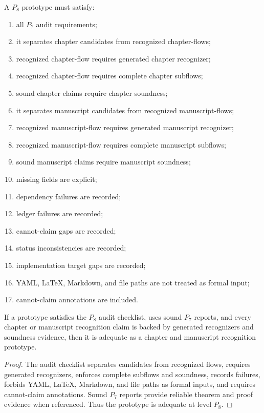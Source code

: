 \begin{definition}
\label{def:chapter-manuscript-p8-audit}
A $P_8$ prototype must satisfy:
\begin{enumerate}
\item all $P_7$ audit requirements;
\item it separates chapter candidates from recognized chapter-flows;
\item recognized chapter-flow requires generated chapter recognizer;
\item recognized chapter-flow requires complete chapter subflows;
\item sound chapter claims require chapter soundness;
\item it separates manuscript candidates from recognized manuscript-flows;
\item recognized manuscript-flow requires generated manuscript recognizer;
\item recognized manuscript-flow requires complete manuscript subflows;
\item sound manuscript claims require manuscript soundness;
\item missing fields are explicit;
\item dependency failures are recorded;
\item ledger failures are recorded;
\item cannot-claim gaps are recorded;
\item status inconsistencies are recorded;
\item implementation target gaps are recorded;
\item YAML, LaTeX, Markdown, and file paths are not treated as formal input;
\item cannot-claim annotations are included.
\end{enumerate}
\end{definition}

\begin{theorem}
\label{thm:chapter-manuscript-p8-adequacy}
If a prototype satisfies the $P_8$ audit checklist, uses sound $P_7$ reports, and every chapter or manuscript recognition claim is backed by generated recognizers and soundness evidence, then it is adequate as a chapter and manuscript recognition prototype.
\end{theorem}

\begin{proof}
The audit checklist separates candidates from recognized flows, requires generated recognizers, enforces complete subflows and soundness, records failures, forbids YAML, LaTeX, Markdown, and file paths as formal inputs, and requires cannot-claim annotations. Sound $P_7$ reports provide reliable theorem and proof evidence when referenced. Thus the prototype is adequate at level $P_8$.
\end{proof}

